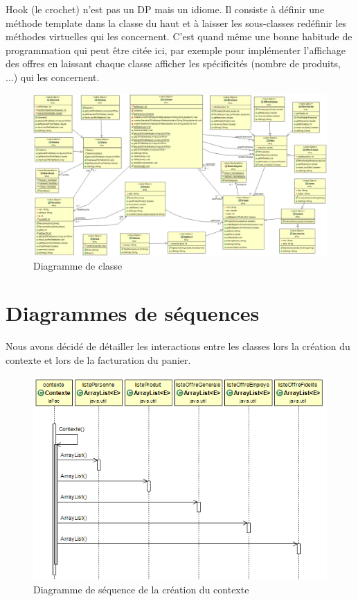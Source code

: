\documentclass{article}
\begin{document}
{
Hook (le crochet) n'est pas un DP mais un idiome. Il consiste à définir une méthode template dans
la classe du haut et à laisser les sous-classes redéfinir les méthodes virtuelles qui les
concernent. C'est quand même une bonne habitude de programmation qui peut être citée ici,
par exemple pour implémenter l'affichage des offres en laissant chaque classe afficher les
spécificités (nombre de produits, ...) qui les concernent.
}

\begin{figure}
	\vfill\hfill %
	\includegraphics[scale=0.36]{diagUML.png}
	\hfill\vfill %
	\caption{Diagramme de classe}
\end{figure}

\clearpage %

\section*{Diagrammes de séquences}

Nous avons décidé de détailler les interactions entre les classes lors la création du contexte et lors de la facturation du panier.

\begin{figure}[ht]
	\begin{center}
		\includegraphics[scale=0.38]{creationContexte.png}
		\caption{Diagramme de séquence de la création du contexte}
	\end{center}
\end{figure}
\end{document}
